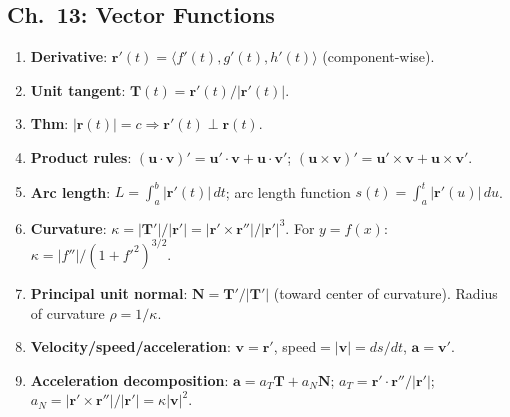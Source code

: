 \documentclass[12pt]{article}
\theoremstyle{compact}
\renewcommand{\vec}[1]{\mathbf{#1}}
\begin{document}
\subsection{Ch.\ 13: Vector Functions}
\begin{enumerate}[label=\textbf{13.\arabic*.},leftmargin=*,itemsep=1pt]
  \item \textbf{Derivative}: $\vec{r}'(t)=\langle f'(t),g'(t),h'(t)\rangle$ (component-wise).
  \item \textbf{Unit tangent}: $\vec{T}(t)=\vec{r}'(t)/|\vec{r}'(t)|$.
  \item \textbf{Thm}: $|\vec{r}(t)|=c\Rightarrow\vec{r}'(t)\perp\vec{r}(t)$.
  \item \textbf{Product rules}: $(\vec{u}\cdot\vec{v})'=\vec{u}'\cdot\vec{v}+\vec{u}\cdot\vec{v}'$; $(\vec{u}\times\vec{v})'=\vec{u}'\times\vec{v}+\vec{u}\times\vec{v}'$.
  \item \textbf{Arc length}: $L=\int_a^b|\vec{r}'(t)|\,dt$; arc length function $s(t)=\int_a^t|\vec{r}'(u)|\,du$.
  \item \textbf{Curvature}: $\kappa=|\vec{T}'|/|\vec{r}'|=|\vec{r}'\times\vec{r}''|/|\vec{r}'|^3$. For $y=f(x)$: $\kappa=|f''|/(1+f'^2)^{3/2}$.
  \item \textbf{Principal unit normal}: $\vec{N}=\vec{T}'/|\vec{T}'|$ (toward center of curvature). Radius of curvature $\rho=1/\kappa$.
  \item \textbf{Velocity/speed/acceleration}: $\vec{v}=\vec{r}'$, speed$=|\vec{v}|=ds/dt$, $\vec{a}=\vec{v}'$.
  \item \textbf{Acceleration decomposition}: $\vec{a}=a_T\vec{T}+a_N\vec{N}$; $a_T=\vec{r}'\cdot\vec{r}''/|\vec{r}'|$; $a_N=|\vec{r}'\times\vec{r}''|/|\vec{r}'|=\kappa|\vec{v}|^2$.
\end{enumerate}
\end{document}
